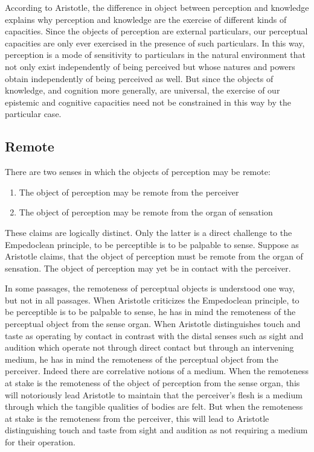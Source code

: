 According to Aristotle, the difference in object between perception and know\-ledge explains why perception and knowledge are the exercise of different kinds of capacities. Since the objects of perception are external particulars, our perceptual capacities are only ever exercised in the presence of such particulars. In this way, perception is a mode of sensitivity to particulars in the natural environment that not only exist independently of being perceived but whose natures and powers obtain independently of being perceived as well. But since the objects of knowledge, and cognition more generally, are universal, the exercise of our epistemic and cognitive capacities need not be constrained in this way by the particular case.


\subsection{Remote} %
\label{sub:remote}

There are two senses in which the objects of perception may be remote:
\begin{enumerate}[(1)]
	\item The object of perception may be remote from the perceiver
	\item The object of perception may be remote from the organ of sensation
\end{enumerate}
These claims are logically distinct. Only the latter is a direct challenge to the Empedoclean principle, to be perceptible is to be palpable to sense. Suppose as Aristotle claims, that the object of perception must be remote from the organ of sensation. The object of perception may yet be in contact with the perceiver.

In some passages, the remoteness of perceptual objects is understood one way, but not in all passages. When Aristotle criticizes the Empedoclean principle, to be perceptible is to be palpable to sense, he has in mind the remoteness of the perceptual object from the sense organ. When Aristotle distinguishes touch and taste as operating by contact in contrast with the distal senses such as sight and audition which operate not through direct contact but through an intervening medium, he has in mind the remoteness of the perceptual object from the perceiver. Indeed there are correlative notions of a medium. When the remoteness at stake is the remoteness of the object of perception from the sense organ, this will notoriously lead Aristotle to maintain that the perceiver's flesh is a medium through which the tangible qualities of bodies are felt. But when the remoteness at stake is the remoteness from the perceiver, this will lead to Aristotle distinguishing touch and taste from sight and audition as not requiring a medium for their operation. 

